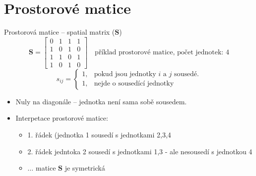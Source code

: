 \documentclass{beamer}
\begin{document}
\section{Prostorové matice}
\begin{frame}{Prostorová matice – spatial matrix ($\bm{S}$)}
$$
\bm{S} = \begin{bmatrix}
0 & 1 & 1 & 1 \\
1 & 0 & 1 & 0 \\
1 & 1 & 0 & 1 \\
1 & 0 & 1 & 0
\end{bmatrix}\quad \text{příklad prostorové matice, počet jednotek: 4}$$
$$s_{ij}=
	\begin{cases}
	1, & \text{pokud jsou jednotky $i$ a $j$ sousedé.}\\
	1, & \text{nejde o sousedící jednotky}
	\end{cases}$$
\begin{itemize}
	\item Nuly na diagonále – jednotka není sama sobě sousedem.
	\item Interpetace prostorové matice: 
	\begin{itemize}
		\item 1. řádek (jednotka 1 sousedí s jednotkami 2,3,4
		\item 2. řádek jedntoka 2 sousedí s jednotkami 1,3 - ale nesousedí s jednotkou 4
		\item $\dots$ matice $\bm{S}$ je symetrická
	\end{itemize}
\end{itemize}
\end{frame}
\end{document}
